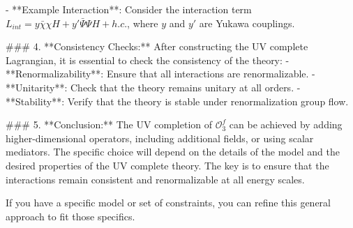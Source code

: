 - **Example Interaction**: Consider the interaction term \(L_{int} = y \bar{\chi} \chi H + y' \bar{\Psi} \Psi H + h.c.\), where \(y\) and \(y'\) are Yukawa couplings.

### 4. **Consistency Checks:**
After constructing the UV complete Lagrangian, it is essential to check the consistency of the theory:
- **Renormalizability**: Ensure that all interactions are renormalizable.
- **Unitarity**: Check that the theory remains unitary at all orders.
- **Stability**: Verify that the theory is stable under renormalization group flow.

### 5. **Conclusion:**
The UV completion of \(\mathcal{O}_3^f\) can be achieved by adding higher-dimensional operators, including additional fields, or using scalar mediators. The specific choice will depend on the details of the model and the desired properties of the UV complete theory. The key is to ensure that the interactions remain consistent and renormalizable at all energy scales.

If you have a specific model or set of constraints, you can refine this general approach to fit those specifics.
